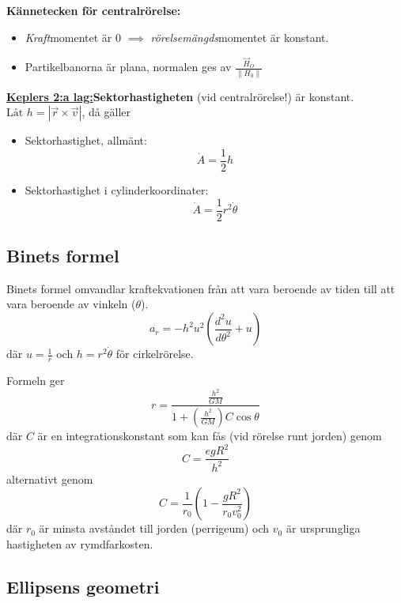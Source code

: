\documentclass{article}
\newenvironment{ankiflashcard}[1]{}{}
\begin{document}
\begin{paracol}{2}
\begin{ankiflashcard}{Definiera centralrörelse och dess kännetecken.}
    \textbf{Kännetecken för centralrörelse:}
    \begin{itemize}
        \item \textit{Kraft}momentet är $0$ $\implies$ \textit{rörelsemängds}momentet är konstant. 
        \item Partikelbanorna är plana, normalen ges av $\frac{\vec H_O}{\left\| H_0 \right\|}$
    \end{itemize}
\end{ankiflashcard}

\begin{ankiflashcard}{Definiera sektorhastigheten vid centralrörelse}
    \underline{\textbf{Keplers 2:a lag:}}\textbf{Sektorhastigheten} (vid centralrörelse!) är konstant.
    $\boxed{\text{Låt }h=\left|\vec r \times \vec v\right|}$, då gäller
    \begin{itemize}
        \item Sektorhastighet, allmänt:
        $$\dot A = \frac 1 2 h$$
        \item  Sektorhastighet i cylinderkoordinater:     $$\dot A = \frac 1 2 r^2 \dot \theta$$
    \end{itemize}
\end{ankiflashcard}

\begin{ankiflashcard}{Formulera Binets formel.}
\subsection{Binets formel}
Binets formel omvandlar kraftekvationen från att vara beroende av tiden till att vara beroende av vinkeln ($\theta$).
$$a_r = -h^2u^2\left(\frac{d^2u}{d\theta^2}+u\right)$$
där $u=\frac{1}{r}$ och $h=r^2\dot \theta$ för cirkelrörelse.
\end{ankiflashcard}

\begin{ankiflashcard}{Uttryck radie med hjälp av Binets formel}
    
Formeln ger
$$
r=\frac{\frac{h^2}{GM}}{1+(\frac{h^2}{GM})C\cos \theta}
$$
där $C$ är en integrationskonstant som kan fås (vid rörelse runt jorden) genom $$C=\frac{egR^2}{h^2}$$ alternativt genom $$C=\frac{1}{r_0}(1-\frac{gR^2}{r_0v_0^2})$$ där $r_0$ är minsta avståndet till jorden (perrigeum) och $v_0$ är ursprungliga hastigheten av rymdfarkosten.
\end{ankiflashcard}
\subsection{Ellipsens geometri}


\end{paracol}
\end{document}
